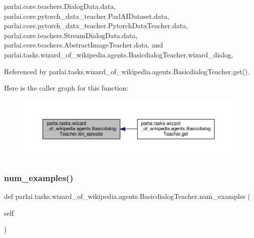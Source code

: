 parlai.\+core.\+teachers.\+Dialog\+Data.\+data, parlai.\+core.\+pytorch\+\_\+data\+\_\+teacher.\+Parl\+A\+I\+Dataset.\+data, parlai.\+core.\+pytorch\+\_\+data\+\_\+teacher.\+Pytorch\+Data\+Teacher.\+data, parlai.\+core.\+teachers.\+Stream\+Dialog\+Data.\+data, parlai.\+core.\+teachers.\+Abstract\+Image\+Teacher.\+data, and parlai.\+tasks.\+wizard\+\_\+of\+\_\+wikipedia.\+agents.\+Basicdialog\+Teacher.\+wizard\+\_\+dialog.



Referenced by parlai.\+tasks.\+wizard\+\_\+of\+\_\+wikipedia.\+agents.\+Basicdialog\+Teacher.\+get().

Here is the caller graph for this function\+:
\nopagebreak
\begin{figure}[H]
\begin{center}
\leavevmode
\includegraphics[width=350pt]{classparlai_1_1tasks_1_1wizard__of__wikipedia_1_1agents_1_1BasicdialogTeacher_a2557378cd9519f4596b2fcc713698056_icgraph}
\end{center}
\end{figure}
\mbox{\label{classparlai_1_1tasks_1_1wizard__of__wikipedia_1_1agents_1_1BasicdialogTeacher_ac740a641709550f191b2c48adfb14a13}} 
\subsubsection{\texorpdfstring{num\+\_\+examples()}{num\_examples()}}
{\footnotesize\ttfamily def parlai.\+tasks.\+wizard\+\_\+of\+\_\+wikipedia.\+agents.\+Basicdialog\+Teacher.\+num\+\_\+examples (\begin{DoxyParamCaption}\item[{}]{self }\end{DoxyParamCaption})}



